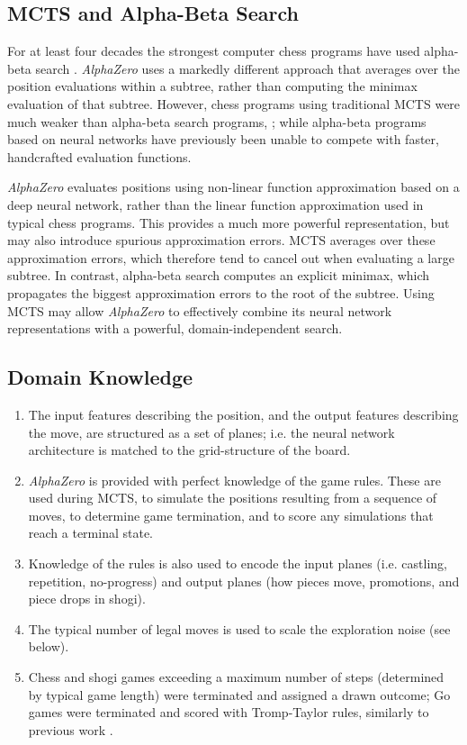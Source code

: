 \documentclass[12pt]{article}
\begin{document}
\subsection*{MCTS and Alpha-Beta Search}

For at least four decades the strongest computer chess programs have used alpha-beta search \cite{Marsland87,KnuthMoore75}. \emph{AlphaZero} uses a markedly different approach that averages over the position evaluations within a subtree, rather than computing the minimax evaluation of that subtree. However, chess programs using traditional MCTS were much weaker than alpha-beta search programs, \cite{ramanujan:uct-fail,arenz:mcc}; while alpha-beta programs based on neural networks have previously been unable to compete with faster, handcrafted evaluation functions. 

\emph{AlphaZero} evaluates positions using non-linear function approximation based on a deep neural network, rather than the linear function approximation used in typical chess programs. This provides a much more powerful representation, but may also introduce spurious approximation errors. MCTS averages over these approximation errors, which therefore tend to cancel out when evaluating a large subtree. In contrast, alpha-beta search computes an explicit minimax, which propagates the biggest approximation errors to the root of the subtree. Using MCTS may allow \emph{AlphaZero} to effectively combine its neural network representations with a powerful, domain-independent search.

\subsection*{Domain Knowledge}

\begin{enumerate}
\item The input features describing the position, and the output features describing the move, are structured as a set of planes; i.e. the neural network architecture is matched to the grid-structure of the board.
\item \emph{AlphaZero} is provided with perfect knowledge of the game rules. These are used during MCTS, to simulate the positions resulting from a sequence of moves, to determine game termination, and to score any simulations that reach a terminal state.
\item  Knowledge of the rules is also used to encode the input planes (i.e. castling, repetition, no-progress) and output planes (how pieces move, promotions, and piece drops in shogi).
\item The typical number of legal moves is used to scale the exploration noise (see below).
\item Chess and shogi games exceeding a maximum number of steps (determined by typical game length) were terminated and assigned a drawn outcome; Go games were terminated and scored with Tromp-Taylor rules, similarly to previous work \cite{Silver17AG0}.
\end{enumerate}
\end{document}
